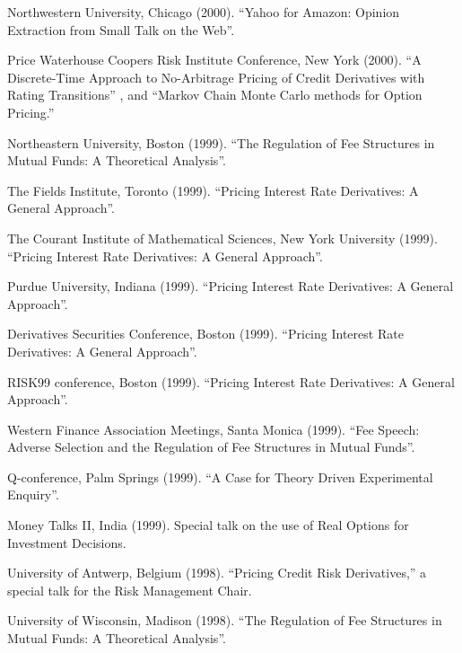 \documentclass{article}
\begin{document}
\begin{etaremune}
{\item Northwestern University, Chicago (2000). 
``Yahoo for Amazon: Opinion Extraction from Small Talk on the Web''.

\item Price Waterhouse Coopers Risk Institute Conference, New York (2000).
 ``A Discrete-Time Approach to No-Arbitrage Pricing of Credit
Derivatives with Rating Transitions'' , and  
``Markov Chain Monte Carlo methods for Option Pricing.''


\item Northeastern University, Boston (1999). 
``The Regulation of Fee Structures in Mutual Funds: A 
Theoretical Analysis''. 

\item The Fields Institute, Toronto (1999). 
``Pricing Interest Rate Derivatives: A General Approach''. 

\item The Courant Institute of Mathematical Sciences, New York
University (1999). 
``Pricing Interest Rate Derivatives: A General Approach''. 

\item Purdue University, Indiana (1999). 
``Pricing Interest Rate Derivatives: A General Approach''. 

\item Derivatives Securities Conference, Boston (1999).
``Pricing Interest Rate Derivatives: A General Approach''. 

\item RISK99 conference, Boston (1999).
``Pricing Interest Rate Derivatives: A General Approach''. 

\item Western Finance Association Meetings, Santa Monica (1999).
``Fee Speech: Adverse Selection and the Regulation of Fee 
Structures in Mutual Funds''. 

\item Q-conference, Palm Springs (1999). 
``A Case for Theory Driven Experimental Enquiry''. 

\item Money Talks II, India (1999). Special talk on the use
of Real Options for Investment Decisions.

\item University of Antwerp, Belgium (1998). ``Pricing Credit Risk 
Derivatives,'' a special talk for the Risk Management Chair.

\item University of Wisconsin, Madison (1998). 
``The Regulation of Fee Structures in Mutual Funds: A Theoretical Analysis''. 
 

}
\end{etaremune}
\end{document}
